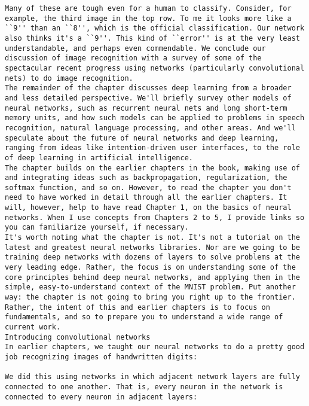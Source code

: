 \begin{lstlisting}
Many of these are tough even for a human to classify. Consider, for example, the third image in the top row. To me it looks more like a ``9'' than an ``8'', which is the official classification. Our network also thinks it's a ``9''. This kind of ``error'' is at the very least understandable, and perhaps even commendable. We conclude our discussion of image recognition with a survey of some of the spectacular recent progress using networks (particularly convolutional nets) to do image recognition.
The remainder of the chapter discusses deep learning from a broader and less detailed perspective. We'll briefly survey other models of neural networks, such as recurrent neural nets and long short-term memory units, and how such models can be applied to problems in speech recognition, natural language processing, and other areas. And we'll speculate about the future of neural networks and deep learning, ranging from ideas like intention-driven user interfaces, to the role of deep learning in artificial intelligence.
The chapter builds on the earlier chapters in the book, making use of and integrating ideas such as backpropagation, regularization, the softmax function, and so on. However, to read the chapter you don't need to have worked in detail through all the earlier chapters. It will, however, help to have read Chapter 1, on the basics of neural networks. When I use concepts from Chapters 2 to 5, I provide links so you can familiarize yourself, if necessary.
It's worth noting what the chapter is not. It's not a tutorial on the latest and greatest neural networks libraries. Nor are we going to be training deep networks with dozens of layers to solve problems at the very leading edge. Rather, the focus is on understanding some of the core principles behind deep neural networks, and applying them in the simple, easy-to-understand context of the MNIST problem. Put another way: the chapter is not going to bring you right up to the frontier. Rather, the intent of this and earlier chapters is to focus on fundamentals, and so to prepare you to understand a wide range of current work.
Introducing convolutional networks
In earlier chapters, we taught our neural networks to do a pretty good job recognizing images of handwritten digits:

We did this using networks in which adjacent network layers are fully connected to one another. That is, every neuron in the network is connected to every neuron in adjacent layers:


\end{lstlisting}
